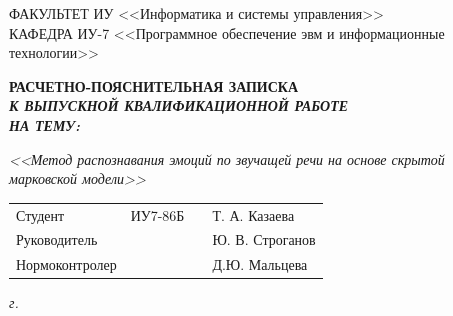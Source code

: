 \begin{titlepage}
	{
		\small \raggedright
		ФАКУЛЬТЕТ ИУ <<Информатика и системы управления>> \\
		\vspace{3.3mm}
		КАФЕДРА ИУ-7 <<Программное обеспечение эвм и информационные технологии>> \\
	}

	\vspace{20.8mm}

	{
		\LARGE \bfseries
		РАСЧЕТНО-ПОЯСНИТЕЛЬНАЯ ЗАПИСКА \\
	}
	\vspace{5mm}
	{
		\Large \bfseries \itshape
		К ВЫПУСКНОЙ КВАЛИФИКАЦИОННОЙ РАБОТЕ \\
		\vspace{5mm}
		НА ТЕМУ: \\
	}

	{
		\Large \itshape
		<<Метод распознавания эмоций по звучащей речи на основе скрытой марковской модели>>
	}

	\vfill
	
	\begin{tabular}{p{}PPT}
		Студент &  ИУ7-86Б & \uline{} & Т. А. Казаева \\
		Руководитель & ~ &  \uline{} & Ю. В. Строганов \\
		Нормоконтролер & ~ &  \uline{} & Д.Ю. Мальцева \\
	\end{tabular}
	
	\vspace{14mm}
	
	\textit{{\the\year} г.}
	
\end{titlepage}